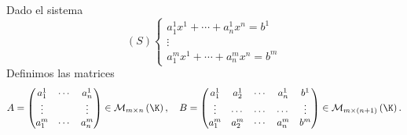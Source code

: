 Dado el sistema 
\[
\left(S\right) 
\begin{cases}
a^{1}_{1}x^{1} + \cdots + a^{1}_{n}x^{n} = b^{1} \\
\vdots \\
a^{m}_{1}x^{1}+\cdots + a^{m}_{n}x^{n} = b^{m}
\end{cases}
\]
Definimos las matrices
\[A = \begin{pmatrix} a^{1}_{1} & \cdots & a^{1}_{n} \\
\vdots & & \vdots \\
a^{m}_{1} & \cdots & a^{m}_{n}\end{pmatrix} \in \mathcal{M}_{m \times n}\left(\K\right), \quad B = \begin{pmatrix} a^{1}_{1} & a^{1}_{2} & \cdots &  a^{1}_{n} & b^{1} \\ \vdots & \cdots & \cdots & \cdots & \vdots \\ a^{m}_{1} & a^{m}_{2} & \cdots & a^{m}_{n}& b^{m}\end{pmatrix}\in\mathcal{M}_{m \times \left(n+1\right)}\left(\K\right) .\]

